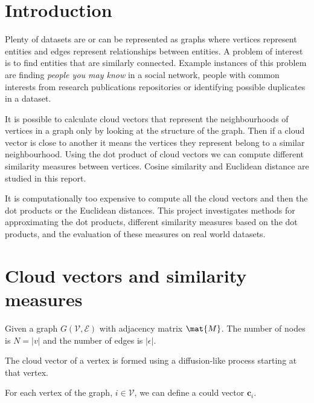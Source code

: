 \documentclass[12pt]{report}
\begin{document}
\section{Introduction}
%
Plenty of datasets are or can be represented as graphs where vertices represent
entities and edges represent relationships between entities. A problem of interest
is to find entities that are similarly connected. Example instances of this
problem are finding \textit{people you may know} in a social network, people with
common interests from research publications repositories or identifying possible
duplicates in a dataset.

It is possible to calculate cloud vectors that represent the neighbourhoods of
vertices in a graph only by looking at the structure of the graph. Then if a cloud
vector is close to another it means the vertices they represent belong to a similar
neighbourhood. Using the dot product of cloud vectors we can compute different
similarity measures between vertices. Cosine similarity and Euclidean distance
are studied in this report.

It is computationally too expensive to compute all the cloud vectors and then
the dot products or the Euclidean distances. This project investigates methods
for approximating the dot products, different similarity measures based on the
dot products, and the evaluation of these measures on real world datasets.


%
%
\section{Cloud vectors and similarity measures}

Given a graph $G(\mathcal{V}, \mathcal{E})$ with adjacency matrix $\mat{M}$. The
number of nodes is $N = |v|$ and the number of edges is $|\epsilon|$.

The cloud vector of a vertex is formed using a diffusion-like process starting at
that vertex. 

For each vertex of the graph, $i \in \mathcal{V}$, we can define a could vector
$\bm{c}_i$.

%
%
\end{document}
